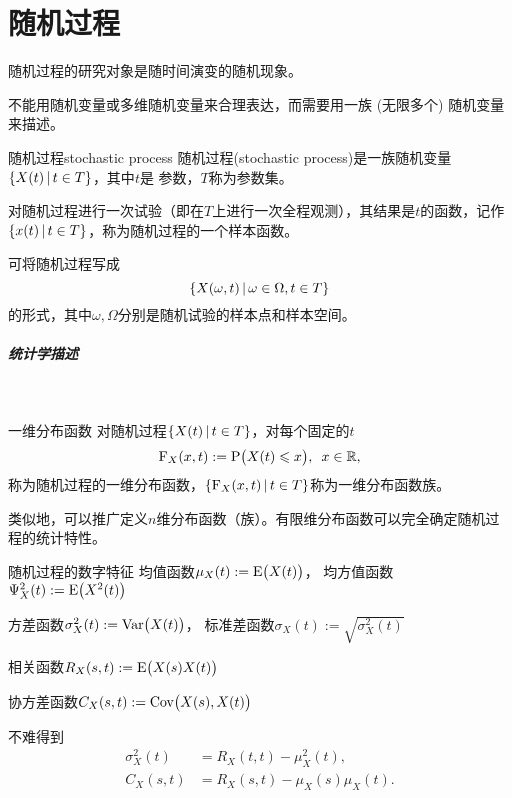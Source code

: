 \chapter{随机过程}
随机过程的研究对象是随时间演变的随机现象。

不能用随机变量或多维随机变量来合理表达，而需要用一族 (无限多个) 随机变量来描述。
\begin{definition}{随机过程}{stochastic process}
	随机过程(stochastic process)是一族随机变量$\left\{X(t)\,\middle\vert\,t\in T\right\}$，其中$ t $是 参数，$T$称为参数集。
\end{definition}
对随机过程进行一次试验（即在$ T $上进行一次全程观测），其结果是$t$的函数，记作$\left\{x(t)\,\middle\vert\,t\in T\right\}$，称为随机过程的一个样本函数。

可将随机过程写成
\[
	\left\{X(\omega,t)\,\middle\vert\,\omega\in\Omega,t\in T\right\}
\]
的形式，其中$\omega,\Omega$分别是随机试验的样本点和样本空间。
\paragraph{统计学描述}~
\begin{definition}{一维分布函数}{}
	对随机过程$\left\{X(t)\,\middle\vert\,t\in T\right\}$，对每个固定的$t$
	\begin{align}
		\operatorname{F}_X(x,t):=\operatorname{P}\bigl(X(t)\leqslant x\bigr),\enspace x\in\mathbb R,
	\end{align}
	称为随机过程的一维分布函数，$\left\{\operatorname{F}_X(x,t)\,\middle\vert\,t\in T\right\}$称为一维分布函数族。
\end{definition}
类似地，可以推广定义$n$维分布函数（族）。有限维分布函数可以完全确定随机过程的统计特性。
\begin{definition}{随机过程的数字特征}{}
	均值函数$\mu_X(t):=\operatorname{E}\bigl(X(t)\bigr)$，
	均方值函数$\Psi^2_X(t):=\operatorname{E}\bigl(X^2(t)\bigr)$

	方差函数$\sigma_X^2(t):=\operatorname{Var}\bigl(X(t)\bigr)$，
	标准差函数$\sigma_X(t):=\sqrt{\sigma^2_X(t)}$

	相关函数$R_X(s,t):=\operatorname{E}\bigl(X(s)X(t)\bigr)$

	协方差函数$C_X(s,t):=\operatorname{Cov}\bigl(X(s),X(t)\bigr)$
\end{definition}
不难得到
\begin{align*}
	\sigma_X^2(t)&=R_X(t,t)-\mu_X^2(t),\\
	C_X(s,t)&=R_X(s,t)-\mu_X(s)\mu_X(t).
\end{align*}
